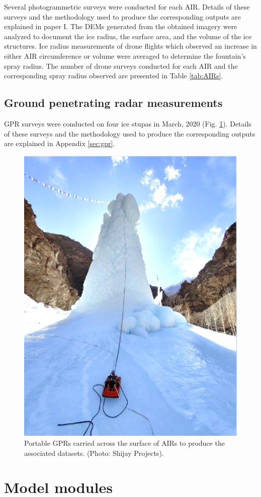 Several photogrammetric surveys were conducted for each \ac{AIR}. Details of these surveys and the
methodology used to produce the corresponding outputs are explained in paper I. The
\ac{DEMs} generated from the obtained imagery were analyzed to document the ice radius, the surface area, and the
volume of the ice structures. Ice radius measurements of drone flights which observed an increase in either \ac{AIR}
circumference or volume were averaged to determine the fountain's spray radius. The number of drone surveys
conducted for each \Ac{AIR} and the corresponding spray radius observed are presented in Table \ref{tab:AIRs}.

\subsection{Ground penetrating radar measurements}

\ac{GPR} surveys were conducted on four ice stupas in March, 2020 (Fig. \ref{fig:gpr_survey}). Details of these
surveys and the methodology used to produce the corresponding outputs are explained in Appendix \ref{sec:gpr}. 

\begin{figure}[htb]
  \centering
	\includegraphics[width=8 cm]{figs/gpr_survey}
  \caption{Portable \ac{GPR}s carried across the surface of \ac{AIRs} to produce the associated datasets.
    (Photo: Shijay Projects).}
	\label{fig:gpr_survey}
\end{figure}


\section{Model modules}
\label{sec:modules}

